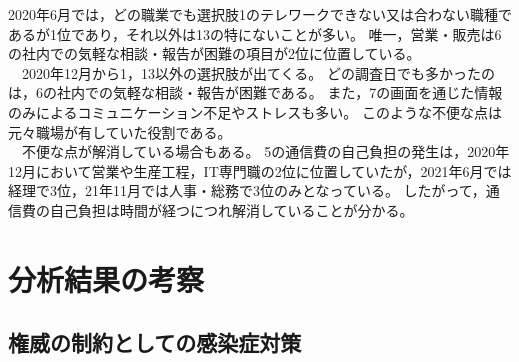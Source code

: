 \documentclass[paper={210mm,297mm},line_length=35zw,number_of_lines=31,head_space=30mm,gutter=40mm,baselineskip=2.0zw,headfoot_verticalposition=1.5zw]{jlreq}
\begin{document}
2020年6月では，どの職業でも選択肢1のテレワークできない又は合わない職種であるが1位であり，それ以外は13の特にないことが多い。
唯一，営業・販売は6の社内での気軽な相談・報告が困難の項目が2位に位置している。\\
　2020年12月から1，13以外の選択肢が出てくる。
どの調査日でも多かったのは，6の社内での気軽な相談・報告が困難である。
また，7の画面を通じた情報のみによるコミュニケーション不足やストレスも多い。
このような不便な点は元々職場が有していた役割である。\\
　不便な点が解消している場合もある。
5の通信費の自己負担の発生は，2020年12月において営業や生産工程，IT専門職の2位に位置していたが，2021年6月では経理で3位，21年11月では人事・総務で3位のみとなっている。
したがって，通信費の自己負担は時間が経つにつれ解消していることが分かる。\\

\section{分析結果の考察}

\subsection{権威の制約としての感染症対策}
\end{document}
